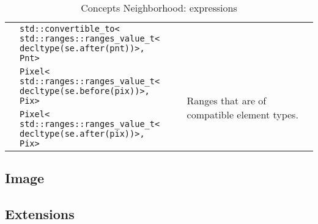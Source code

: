 \begin{table}[!htbp]
\begin{scriptsize}
\begin{tabular}{llll}
      \multicolumn{1}{c|}{}                              & \makecell[l]{\texttt{std::convertible\_to<}                                                                                                              \\\texttt{std::ranges::ranges\_value\_t<}\\\texttt{decltype(se.after(pnt))>, Pnt>}}  &                                               &                                                                    \\
      \multicolumn{1}{c|}{}                              & \makecell[l]{\texttt{Pixel<}                                                                                                                             \\\texttt{std::ranges::ranges\_value\_t<}\\\texttt{decltype(se.before(pix))>, Pix>}}                 &                                               & \multirow{2}{*}{Ranges that are of compatible element types.}      \\
      \multicolumn{1}{c|}{}                              & \makecell[l]{\texttt{Pixel<}                                                                                                                             \\\texttt{std::ranges::ranges\_value\_t<}\\\texttt{decltype(se.after(pix))>, Pix>}}                  &                                               &                                                                    \\
      \cline{1-4}
    \end{tabular}
    \smallskip

    \caption{Concepts Neighborhood: expressions}
  \end{scriptsize}
  \label{concept.tables.nbh.expressions}
\end{table}

\subsection{Image}
\label{image_and_algorithms_taxonomy.concepts.subsec.image}


\subsection{Extensions}
\label{image_and_algorithms_taxonomy.concepts.subsec.ext}

